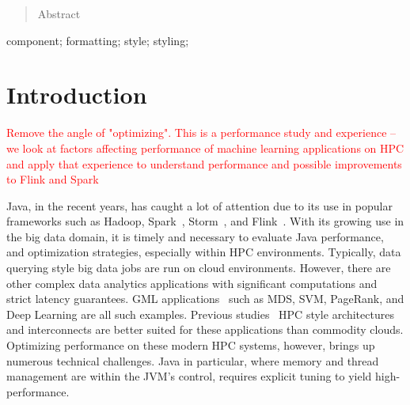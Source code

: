 \documentclass[10pt, conference, compsocconf]{IEEEtran}
\begin{document}
\begin{abstract}
Abstract

\end{abstract}

\begin{IEEEkeywords}
component; formatting; style; styling;

\end{IEEEkeywords}


%
\IEEEpeerreviewmaketitle



\section{Introduction} \label{sec:intro}
\textcolor{red}{Remove the angle of "optimizing". This is a performance study and experience -- we look at factors affecting performance of machine learning applications on HPC and apply that experience to understand performance and possible improvements to Flink and Spark}

Java, in the recent years, has caught a lot of attention due to its use in popular frameworks such as Hadoop, Spark~\cite{Zaharia:2010:SCC:1863103.1863113}, Storm~\cite{toshniwal2014storm}, and Flink~\cite{carbone2015lightweight}. With its growing use in the big data domain, it is timely and necessary to evaluate Java performance, and optimization strategies, especially within \ac{HPC} environments. Typically, data querying style big data jobs are run on cloud environments. However, there are other complex data analytics applications with significant computations and strict latency guarantees. \ac{GML} applications~ such as \ac{MDS}, \ac{SVM}, PageRank, and Deep Learning are all such examples. Previous studies~ \ac{HPC} style architectures and interconnects are better suited for these applications than commodity clouds. Optimizing performance on these modern \ac{HPC} systems, however, brings up numerous technical challenges. Java in particular, where memory and thread management are within the \ac{JVM}'s control, requires explicit tuning to yield high-performance. 
\end{document}

